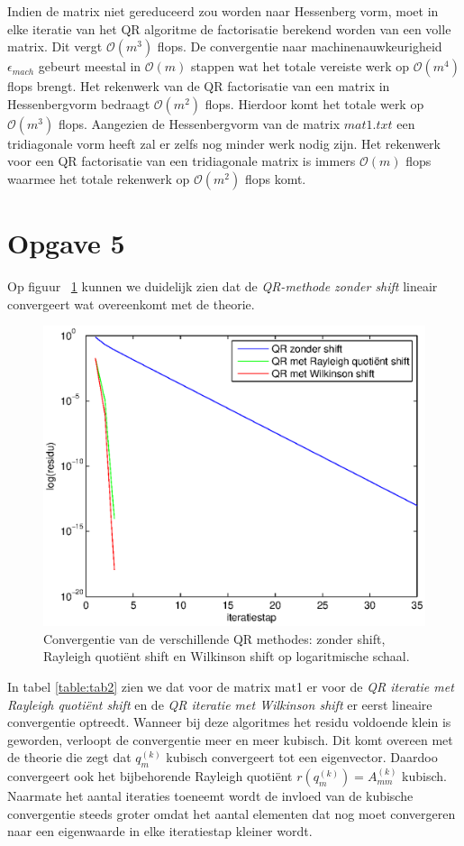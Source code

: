 \documentclass[a4paper]{article}
\newcommand{\opgave}[1]{\section*{Opgave #1}}
\begin{document}
Indien de matrix niet gereduceerd zou worden naar Hessenberg vorm, moet in elke iteratie van het QR algoritme de factorisatie berekend worden van een volle matrix. Dit vergt $\mathcal{O}(m^{3})$ flops. De convergentie naar machinenauwkeurigheid $\epsilon _{mach}$ gebeurt meestal in $\mathcal{O}(m)$ stappen wat het totale vereiste werk op $\mathcal{O}(m^{4})$ flops brengt. Het rekenwerk van de QR factorisatie van een matrix in Hessenbergvorm bedraagt $\mathcal{O}(m^{2})$ flops. Hierdoor komt het totale werk op $\mathcal{O}(m^{3})$ flops. Aangezien de Hessenbergvorm van de matrix $mat1.txt$ een tridiagonale vorm heeft zal er zelfs nog minder werk nodig zijn. Het rekenwerk voor een QR factorisatie van een tridiagonale matrix is immers $\mathcal{O}(m)$ flops waarmee het totale rekenwerk op $\mathcal{O}(m^{2})$ flops komt.
\opgave{5}
Op figuur ~\ref{fig:opgave5} kunnen we duidelijk zien dat de \textit{QR-methode zonder shift} lineair convergeert wat overeenkomt met de theorie.
\begin{figure}[H]
\centerline{\includegraphics{pictures/opgave5grafiek.eps}}
\caption{Convergentie van de verschillende QR methodes: zonder shift, Rayleigh quoti\"{e}nt shift en Wilkinson shift op logaritmische schaal.}
\label{fig:opgave5}
\end{figure}
In tabel \ref{table:tab2} zien we dat voor de matrix mat1 er voor de \textit{QR iteratie met Rayleigh quoti\"{e}nt shift} en de \textit{QR iteratie met Wilkinson shift} er eerst lineaire convergentie optreedt. Wanneer bij deze algoritmes het residu voldoende klein is geworden, verloopt de convergentie meer en meer kubisch. Dit komt overeen met de theorie die zegt dat $q_m^{(k)}$ kubisch convergeert tot een eigenvector. Daardoo convergeert ook het bijbehorende Rayleigh quoti\"{e}nt $r(q_m^{(k)})=A_{mm}^{(k)}$ kubisch. Naarmate het aantal iteraties toeneemt wordt de invloed van de kubische convergentie steeds groter omdat het aantal elementen dat nog moet convergeren naar een eigenwaarde in elke iteratiestap kleiner wordt.
\end{document}
